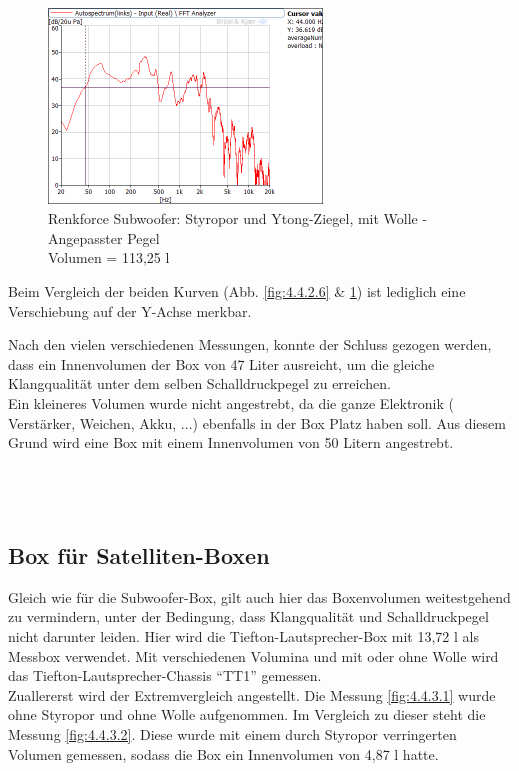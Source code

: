 \begin{figure} [H]
\centering
\includegraphics[width=0.65\textwidth]{img/Optimierung/Sub/RenkforceStyro_113l_Wolle_Angepasst.png}
\caption{Renkforce Subwoofer: Styropor und Ytong-Ziegel, mit Wolle - Angepasster Pegel \\Volumen = 113,25 l}
\label{fig:4.4.2.7}
\end{figure}
Beim Vergleich der beiden Kurven (Abb. \ref{fig:4.4.2.6} \& \ref{fig:4.4.2.7}) ist lediglich eine Verschiebung auf der Y-Achse merkbar.

\newpage
Nach den vielen verschiedenen Messungen, konnte der Schluss gezogen werden, dass ein Innenvolumen der Box von 47 Liter ausreicht, um die gleiche Klangqualität unter dem selben Schalldruckpegel zu erreichen.\\
Ein kleineres Volumen wurde nicht angestrebt, da die ganze Elektronik ( Verstärker, Weichen, Akku, ...) ebenfalls in der Box Platz haben soll.
Aus diesem Grund wird eine Box mit einem Innenvolumen von 50 Litern angestrebt.\\ \\ \\ \\




\subsection{Box für Satelliten-Boxen}\label{subsec:4.4.3}
Gleich wie für die Subwoofer-Box, gilt auch hier das Boxenvolumen weitestgehend zu vermindern, unter der Bedingung, dass Klangqualität und Schalldruckpegel nicht darunter leiden.
Hier wird die Tiefton-Lautsprecher-Box mit 13,72 l als Messbox verwendet.
Mit verschiedenen Volumina und mit oder ohne Wolle wird das Tiefton-Lautsprecher-Chassis \enquote{TT1} gemessen.\\
Zuallererst wird der Extremvergleich angestellt.
Die Messung \ref{fig:4.4.3.1} wurde ohne Styropor und ohne Wolle aufgenommen.
Im Vergleich zu dieser steht die Messung \ref{fig:4.4.3.2}.
Diese wurde mit einem durch Styropor verringerten Volumen gemessen, sodass die Box ein Innenvolumen von 4,87 l hatte.

